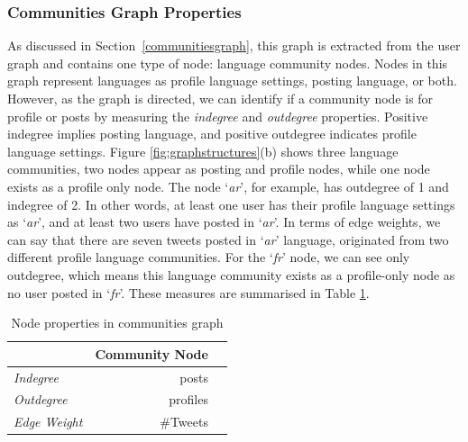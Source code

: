 \documentclass{llncs}
\begin{document}
\subsubsection{Communities Graph Properties}

As discussed in Section~\ref{communitiesgraph}, this graph is
extracted from the user graph and contains one type of node: language
community nodes. Nodes in this graph represent languages as profile
language settings, posting language, or both.  However, as the graph
is directed, we can identify if a community node is for profile or
posts by measuring the \emph{indegree} and \emph{outdegree}
properties.  Positive indegree implies posting language, and positive
outdegree indicates profile language settings. Figure
\ref{fig:graphstructures}(b) shows three language communities, two
nodes appear as posting and profile nodes, while one node exists as a
profile only node. The node `{\emph{ar}}', for example, has outdegree
of 1 and indegree of 2.  In other words, at least one user has their
profile language settings as `{\emph{ar}}', and at least two users
have posted in `{\emph{ar}}'. In terms of edge weights, we can say
that there are seven tweets posted in `{\emph{ar}}' language,
originated from two different profile language communities.  For the
`{\emph{fr}}' node, we can see only outdegree, which means this
language community exists as a profile-only node as no user posted in
`{\emph{fr}}'.  These measures are summarised in Table
\ref{tbl:communitiesgraph}.

\begin{table}[!htb]
\centering
\begin{tabular}{@{}lrr@{}}
\toprule
\textbf{}& \textbf{Community Node} \\ \midrule
{\emph{Indegree}} &  posts\\
{\emph{Outdegree}} & profiles \\ 
{\emph{Edge Weight}}& \#Tweets\\ \bottomrule
\end{tabular}
\caption{Node properties in communities graph}
\label{tbl:communitiesgraph}
\end{table}

\end{document}
